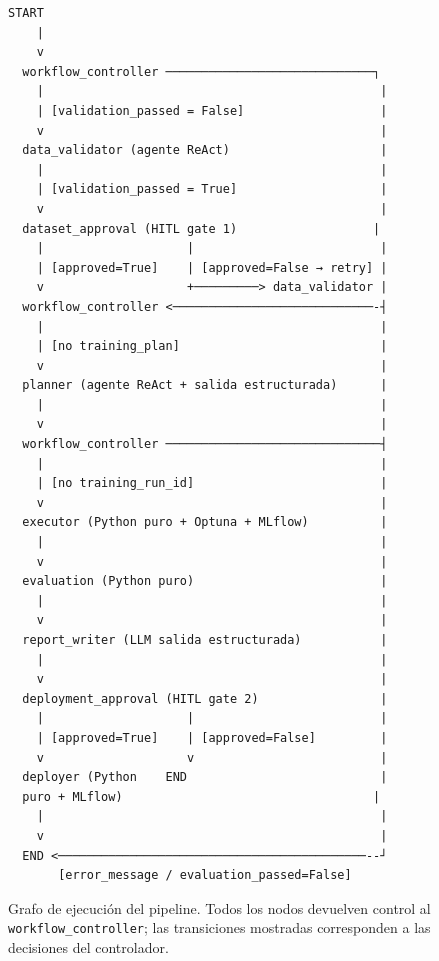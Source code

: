 \begin{figure}[H]
\centering
\begin{Verbatim}[fontsize=\small]
  START
    |
    v
  workflow_controller ─────────────────────────────┐
    |                                               |
    | [validation_passed = False]                   |
    v                                               |
  data_validator (agente ReAct)                     |
    |                                               |
    | [validation_passed = True]                    |
    v                                               |
  dataset_approval (HITL gate 1)                   |
    |                    |                          |
    | [approved=True]    | [approved=False → retry] |
    v                    +─────────> data_validator |
  workflow_controller <────────────────────────────-┤
    |                                               |
    | [no training_plan]                            |
    v                                               |
  planner (agente ReAct + salida estructurada)      |
    |                                               |
    v                                               |
  workflow_controller ──────────────────────────────┤
    |                                               |
    | [no training_run_id]                          |
    v                                               |
  executor (Python puro + Optuna + MLflow)          |
    |                                               |
    v                                               |
  evaluation (Python puro)                          |
    |                                               |
    v                                               |
  report_writer (LLM salida estructurada)           |
    |                                               |
    v                                               |
  deployment_approval (HITL gate 2)                 |
    |                    |                          |
    | [approved=True]    | [approved=False]         |
    v                    v                          |
  deployer (Python    END                           |
  puro + MLflow)                                   |
    |                                               |
    v                                               |
  END <───────────────────────────────────────────--┘
       [error_message / evaluation_passed=False]
\end{Verbatim}
\caption{Grafo de ejecución del pipeline. Todos los nodos devuelven control al \texttt{workflow\_controller}; las transiciones mostradas corresponden a las decisiones del controlador.}
\label{fig:flujo-ejecucion}
\end{figure}

